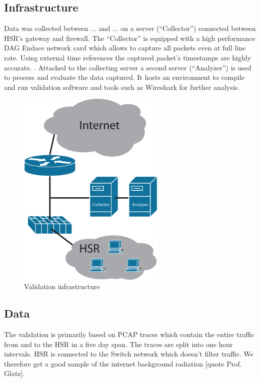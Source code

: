 \documentclass[a4paper]{scrartcl}
\begin{document}
\subsection{Infrastructure}
Data was collected between ... and ... on a server (``Collector'') connected between HSR's gateway and firewall.  The ``Collector'' is equipped with a high performance DAG Endace network card which allows to capture all packets even at full line rate. Using external time references the captured packet's timestamps are highly accurate. \cite{endace}. Attached to the collecting server a second server (``Analyzer'') is used to process and evaluate the data captured. It hosts an environment to compile and run validation software and tools such as Wireshark for further analysis.
\begin{figure}[ht]
	\begin{center}
		\includegraphics[width=200pt, keepaspectratio=true]{Bilder/Infrastruktur.eps}
		\caption{Validation infrastructure}
		\label{infra}
	\end{center}
\end{figure}

\subsection{Data}
The validation is primarily based on PCAP traces which contain the entire traffic from and to the HSR in a five day span. The traces are split into one hour intervals. HSR is connected to the Switch network which doesn't filter traffic. We therefore get a good sample of the internet background radiation [quote Prof. Glatz].
\end{document}
